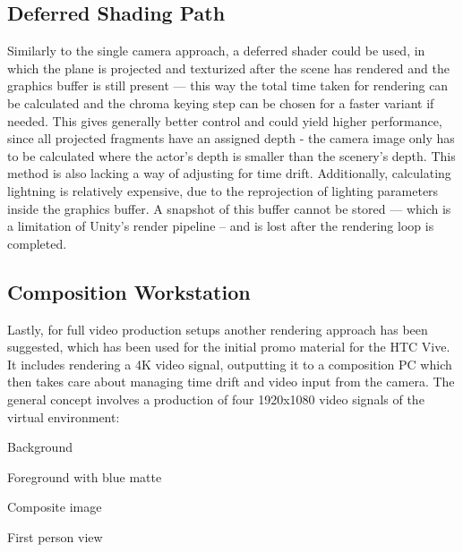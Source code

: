 \subsection{Deferred Shading Path}

Similarly to the single camera approach, a deferred shader could be used, in 
which the plane is projected and texturized after the scene has rendered and 
the graphics buffer is still present --- this way the total time taken for 
rendering can be calculated and the chroma keying step can be chosen for a 
faster variant if needed. This gives generally better control and could yield 
higher performance, since all projected fragments have an assigned depth - the 
camera image only has to be calculated where the actor's depth is smaller than 
the scenery's depth. This method is also lacking a way of adjusting for time 
drift. Additionally, calculating lightning is relatively expensive, due to the 
reprojection of lighting parameters inside the graphics buffer. A snapshot of 
this buffer cannot be stored --- which is a limitation of Unity's render 
pipeline -- and is lost after the rendering loop is completed.

\subsection{Composition Workstation}

Lastly, for full video production setups another rendering approach has been 
suggested, which has been used for the initial promo material for the HTC 
Vive\cite{valve:vive-trailer:2016}. It includes rendering a 4K video signal, 
outputting it to a composition PC which then takes care about managing time 
drift and video input from the camera.
\newline
The general concept involves a production of four 1920x1080 video signals of 
the virtual environment:
\begin{my_list}
	\item Background
	\item Foreground with blue matte
	\item Composite image
	\item First person view
\end{my_list}

